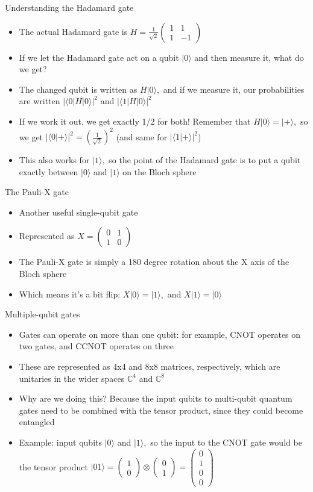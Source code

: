 \documentclass[aspectratio=169, handout]{beamer}
\newcommand{\twovec}[2]{\begin{pmatrix} #1 \\ #2 \end{pmatrix}}
\newcommand{\twomat}[4]{\begin{pmatrix} #1 & #2 \\ #3 & #4 \end{pmatrix}}
\begin{document}
\begin{frame}{Understanding the Hadamard gate}
    \begin{itemize}
        \item The actual Hadamard gate is $H = \frac{1}{\sqrt{2}}\twomat{1}{1}{1}{-1}$ \pause
        \item If we let the Hadamard gate act on a qubit $|0 \rangle$ and then measure it, what do we get? \pause
        \item The changed qubit is written as $H|0\rangle,$ and if we measure it, our probabilities are written $|\langle 0 | H | 0 \rangle|^2$ and $|\langle 1 | H | 0 \rangle|^2$ \pause
        \item If we work it out, we get exactly 1/2 for both! Remember that $H|0\rangle = |+\rangle,$ so we get $|\langle 0 | + \rangle|^2 = (\frac{1}{\sqrt{2}})^2$ (and same for $|\langle 1 | + \rangle|^2$) \pause
        \item This also works for $|1\rangle,$ so the point of the Hadamard gate is to put a qubit exactly between $|0\rangle$ and $|1\rangle$ on the Bloch sphere
    \end{itemize}
\end{frame}

\begin{frame}{The Pauli-X gate}
    \begin{itemize}
        \item Another useful single-qubit gate \pause
        \item Represented as $X = \twomat{0}{1}{1}{0}$ \pause
        \item The Pauli-X gate is simply a 180 degree rotation about the X axis of the Bloch sphere \pause
        \item Which means it's a bit flip: $X|0\rangle = |1\rangle,$ and $X|1\rangle = |0\rangle$
    \end{itemize}
\end{frame}

\begin{frame}{Multiple-qubit gates}
    \begin{itemize}
        \item Gates can operate on more than one qubit: for example, CNOT operates on two gates, and CCNOT operates on three \pause
        \item These are represented as 4x4 and 8x8 matrices, respectively, which are unitaries in the wider spaces $\mathbb{C}^4$ and $\mathbb{C}^8$ \pause
        \item Why are we doing this? Because the input qubits to multi-qubit quantum gates need to be combined with the tensor product, since they could become entangled \pause
        \item Example: input qubits $|0\rangle$ and $|1\rangle,$ so the input to the CNOT gate would be the tensor product $|01\rangle = \twovec{1}{0} \otimes \twovec{0}{1} = \begin{pmatrix}
            0 \\ 1 \\ 0 \\ 0
        \end{pmatrix}$
    \end{itemize}
\end{frame}
\end{document}
